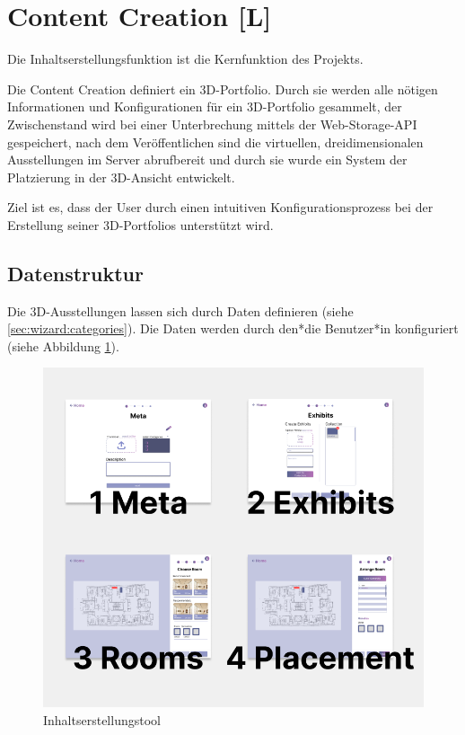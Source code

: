 \section{Content Creation [L]}
\label{content-creation}
Die Inhaltserstellungsfunktion ist die Kernfunktion des Projekts.

Die Content Creation definiert ein 3D-Portfolio. Durch sie werden alle nötigen Informationen und Konfigurationen für ein 3D-Portfolio gesammelt, der Zwischenstand wird bei einer Unterbrechung mittels der Web-Storage-API gespeichert, nach dem Veröffentlichen sind die virtuellen, dreidimensionalen Ausstellungen im Server abrufbereit und durch sie wurde ein System der Platzierung in der 3D-Ansicht entwickelt.

Ziel ist es, dass der User durch einen intuitiven Konfigurationsprozess bei der Erstellung seiner 3D-Portfolios unterstützt wird.

\subsection{Datenstruktur}
Die 3D-Ausstellungen lassen sich durch Daten definieren (siehe \ref{sec:wizard:categories}). Die Daten werden durch den*die Benutzer*in konfiguriert (siehe Abbildung \ref{fig:impl:creation:fourCategoires}).

\begin{figure}[ht]
    \centering
    \includegraphics[scale=0.4]{pics/CreateCreation4Categories.png}
    \caption{Inhaltserstellungstool}
    \label{fig:impl:creation:fourCategoires}
\end{figure}


